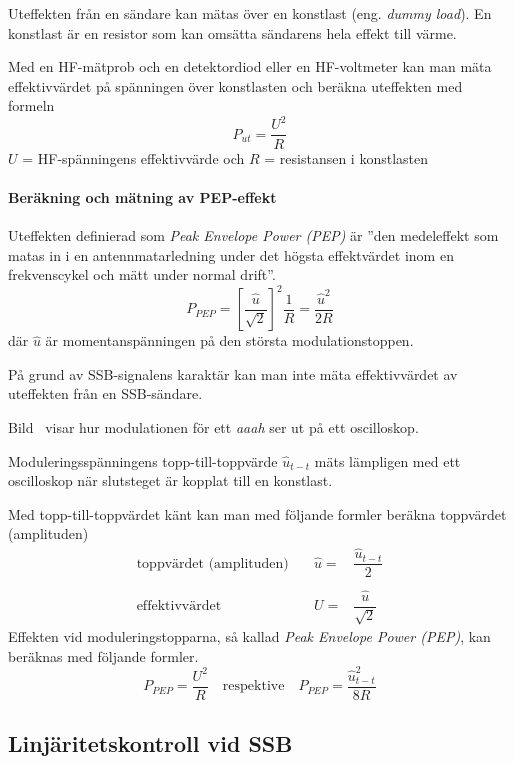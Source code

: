 Uteffekten från en sändare kan mätas över en konstlast (eng. \emph{dummy load}).
En konstlast är en resistor som kan omsätta sändarens hela effekt till värme.

Med en HF-mätprob och en detektordiod eller en HF-voltmeter kan man mäta
effektivvärdet på spänningen över konstlasten och beräkna uteffekten med
formeln
%
\[P_{ut} = \dfrac{U^2}{R}\]
%
\(U\) = HF-spänningens effektivvärde och 
\(R\) = resistansen i konstlasten

\paragraph{Beräkning och mätning av PEP-effekt}

Uteffekten definierad som \emph{Peak Envelope Power (PEP)} \cite[1.157]{ITU-RR}
är ''den medeleffekt som matas in i en antennmatarledning under det högsta
effektvärdet inom en frekvenscykel och mätt under normal drift''.
%
\[P_{PEP} = \left[\dfrac{\hat{u}}{\sqrt{2}}\right]^2\dfrac{1}{R} =  \dfrac{\hat{u}^2}{2R}\]
%
där \(\hat{u}\) är momentanspänningen på den största modulationstoppen.


På grund av SSB-signalens karaktär kan man inte mäta effektivvärdet av
uteffekten från en SSB-sändare.

Bild~ visar hur modulationen för ett \emph{aaah} ser ut
på ett oscilloskop.

Moduleringsspänningens topp-till-topp\-värde \(\hat{u}_{t-t}\) mäts lämpligen med ett
oscilloskop när slutsteget är kopplat till en konstlast.

Med topp-till-toppvärdet känt kan man med följande formler beräkna
toppvärdet (amplituden)
%
\[
\begin{array}{lll}
\text{toppvärdet (amplituden)} &  \quad \hat{u}= & \dfrac{\hat{u}_{t-t}}{2}\\
& & \\
\text{effektivvärdet} &\quad  U =& \dfrac{\hat{u}}{\sqrt{2}}
\end{array}
\]%
%
Effekten vid moduleringstopparna, så kallad \emph{Peak Envelope Power (PEP)},
kan beräknas med följande formler.
%
\[
P_{PEP} = \dfrac{U^2}{R} \quad\text{respektive}\quad
P_{PEP} = \dfrac{\hat{u}_{t-t}^2}{8R}
\]

\subsection{Linjäritetskontroll vid SSB}

